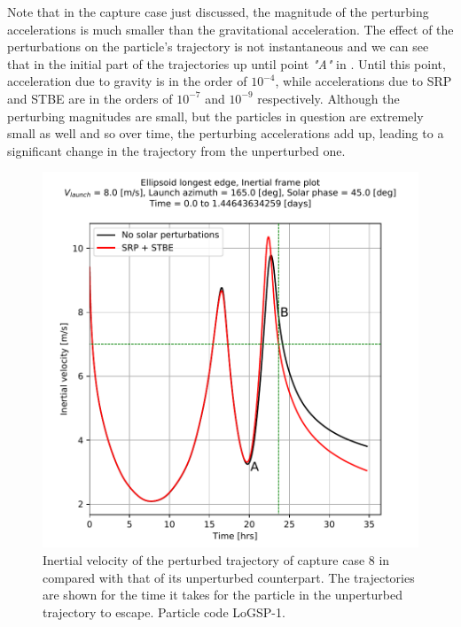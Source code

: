 Note that in the capture case just discussed, the magnitude of the perturbing accelerations is much smaller than the gravitational acceleration. The effect of the perturbations on the particle's trajectory is not instantaneous and we can see that in the initial part of the trajectories up until point \textit{"A"} in . Until this point, acceleration due to gravity is in the order of $10^{-4}$, while accelerations due to \gls{SRP} and \gls{STBE} are in the orders of $10^{-7}$ and $10^{-9}$ respectively. Although the perturbing magnitudes are small, but the particles in question are extremely small as well and so over time, the perturbing accelerations add up, leading to a significant change in the trajectory from the unperturbed one.
\begin{figure}[htb]
\centering
\captionsetup{justification=centering}
\includegraphics[width=\textwidth, height=0.5\textheight, keepaspectratio=true]{longest_edge_perturbations/3.2Density_1cmSize/8ms_165Azimuth_45SolarPhase/comparative_analysis_allPerturbations_inertialVelocity_edit.pdf}
\caption{Inertial velocity of the perturbed trajectory of capture case 8 in  compared with that of its unperturbed counterpart. The trajectories are shown for the time it takes for the particle in the unperturbed trajectory to escape. Particle code LoGSP-1.}
\label{fig:LoGSP_1_capture_case_8_comparative_inertial_velocity}
\end{figure}
